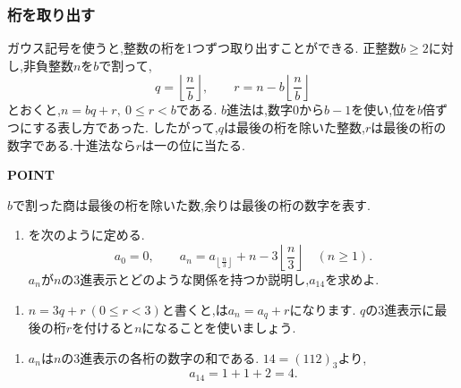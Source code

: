 \subsubsection{桁を取り出す}\label{節：桁を取り出す}
ガウス記号を使うと,整数の桁を1つずつ取り出すことができる.
正整数$b\ge2$に対し,非負整数$n$を$b$で割って,
\[
  q=\left\lfloor\frac nb\right\rfloor,
  \qquad r=n-b\left\lfloor\frac nb\right\rfloor
\]
とおくと,$n=bq+r,\ 0\le r<b$である.
$b$進法は,数字$0$から$b-1$を使い,位を$b$倍ずつにする表し方であった.
したがって,$q$は最後の桁を除いた整数,$r$は最後の桁の数字である.十進法なら$r$は一の位に当たる.

\begin{bookpoint}
  \textbf{POINT}\par
  $b$で割った商は最後の桁を除いた数,余りは最後の桁の数字を表す.
\end{bookpoint}

\noindent {}\par\nobreak
\begin{enumerate}[label=(\arabic*),parsep=3pt,beginpenalty=10000,format=\bookitemlink{example-gauss-role-8}{problem}{answer}]
  \item {}を次のように定める.
    \[
      a_0=0,\qquad
      a_n=a_{\left\lfloor\frac n3\right\rfloor}
      +n-3\left\lfloor\frac n3\right\rfloor
      \quad(n\ge1).
    \]
    $a_n$が$n$の3進表示とどのような関係を持つか説明し,$a_{14}$を求めよ.
\end{enumerate}

\noindent {}\par\nobreak
\begin{enumerate}[label=(\arabic*),parsep=3pt,beginpenalty=10000,format=\bookitemlink{example-gauss-role-8}{hint}{problem}]
  \item $n=3q+r\ (0\le r<3)$と書くと,は$a_n=a_q+r$になります.
    $q$の3進表示に最後の桁$r$を付けると$n$になることを使いましょう.
\end{enumerate}

\noindent {}\par\nobreak
\begin{enumerate}[label=(\arabic*),parsep=3pt,beginpenalty=10000,format=\bookitemlink{example-gauss-role-8}{answer}{problem}]
  \item $a_n$は$n$の3進表示の各桁の数字の和である.
    $14=(112)_3$より,
    \[
      a_{14}=1+1+2=4.
    \]
\end{enumerate}


